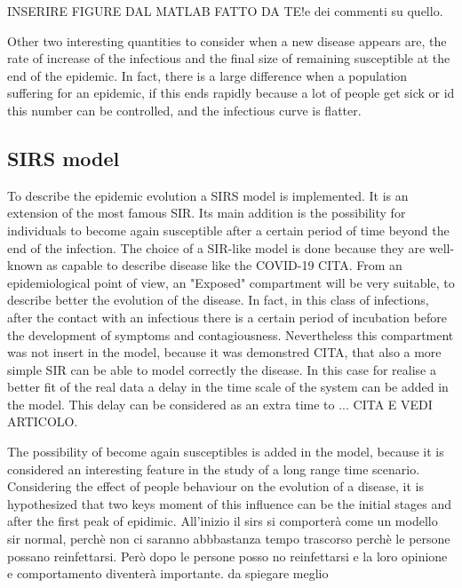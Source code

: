  
INSERIRE FIGURE DAL MATLAB FATTO DA TE!e dei commenti su quello. 

Other two interesting quantities to consider when a new disease appears are, the rate of increase of the infectious and the final size of remaining susceptible at the end of the epidemic. In fact, there is a large difference when a population suffering for an epidemic, if this ends rapidly because a lot of people get sick or id this number can be controlled, and the infectious curve is flatter.

\subsection{SIRS model}
\label{subsec:SIRS}
To describe the epidemic evolution a  SIRS model is implemented. It is an extension of the most famous SIR. Its main addition is the possibility for individuals to become again susceptible after a certain period of time beyond the end of the infection. The choice of a SIR-like model is done because they are well-known as capable to describe disease like the COVID-19 CITA. From an epidemiological point of view, an "Exposed" compartment will be very suitable, to describe better the evolution of the disease. In fact, in this class of infections, after the contact with an infectious there is a certain period of incubation before the development of symptoms and contagiousness. Nevertheless this compartment was not insert in the model, because it was demonstred CITA, that also a more simple SIR can be able to model correctly the disease. In this case for realise a better fit of the real data a delay in the time scale of the system can be added in the model. This delay can be considered as an extra time to ... CITA E VEDI ARTICOLO.

The possibility of become again susceptibles is added in the model, because it is considered an interesting feature in the study of a long range time scenario. 
Considering the effect of people behaviour on the evolution of a disease, it is hypothesized that two keys moment of this influence can be the initial stages and after the first peak of epidimic. 
All'inizio il sirs si comporterà come un modello sir normal, perchè non ci saranno abbbastanza tempo trascorso perchè le persone possano reinfettarsi. Però dopo le persone posso no reinfettarsi e la loro opinione e comportamento diventerà importante. da spiegare meglio

